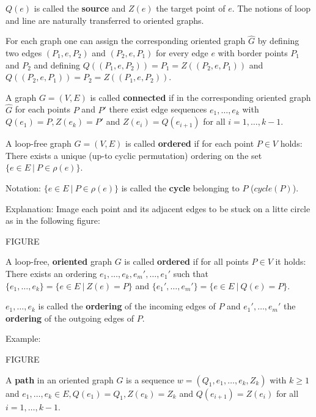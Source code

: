 $Q(e)$ is called the {\bf source} and $Z(e)$ the target point of $e$. The
notions of loop and line are naturally transferred to oriented graphs.

For each graph one can assign the corresponding oriented graph $\hat{G}$ by
defining two edges $(P_1,e,P_2)$ and $(P_2,e,P_1)$ for every edge $e$ with border points
$P_1$ and $P_2$ and defining $Q((P_1,e,P_2)) = P_1 = Z((P_2,e,P_1))$ and
$Q((P_2,e,P_1)) = P_2 = Z((P_1,e,P_2))$.

\begin{definition}
A graph $G = (V,E)$ is called {\bf connected} if in the corresponding oriented
graph $\hat{G}$ for each points $P$ and $P'$ there exist edge sequences $e_1,
\ldots, e_k$ with $Q(e_1) = P, Z(e_k) = P'$ and $Z(e_i) = Q(e_{i+1})$ for all
$i = 1, \ldots, k-1$.
\end{definition}

\begin{definition}
A loop-free graph $G = (V,E)$ is called {\bf ordered} if for each point $P \in
V$ holds: There exists a unique (up-to cyclic permutation) ordering on the set
$\{ e \in E \ |\ P \in \rho(e) \}$.
\end{definition}

Notation: $\{ e \in E \ |\ P \in \rho(e) \}$ is called the {\bf cycle} belonging
to $P$ ($cycle(P)$).

Explanation: Image each point and its adjacent edges to be stuck on a litte
circle as in the following figure:

FIGURE

\begin{definition}
A loop-free, {\bf oriented} graph $G$ is called {\bf ordered} if for all points
$P \in V$ it	holds: There exists an ordering $e_1, \ldots, e_k, e_m', \ldots,
e_1'$ such that $\{ e_1, \ldots, e_k \} = \{ e \in E\ |\ Z(e) = P \}$ and $\{
e_1', \ldots, e_m' \} = \{ e \in E\ |\ Q(e) = P \}$. 
\end{definition}

$e_1, \ldots, e_k$ is called the {\bf ordering} of the incoming edges of $P$ and
$e_1', \ldots, e_m'$ the {\bf ordering} of the outgoing edges of $P$.

Example:

FIGURE

\begin{definition}
A {\bf path} in an oriented graph $G$ is a sequence $w = (Q_1, e_1, \ldots,
e_k, Z_k)$ with $k \geq 1$ and $e_1, \ldots, e_k \in E, Q(e_1) = Q_1,
Z(e_k)=Z_k$ and $Q(e_{i+1}) = Z(e_i)$ for all $i = 1, \ldots, k-1$.
\end{definition}

